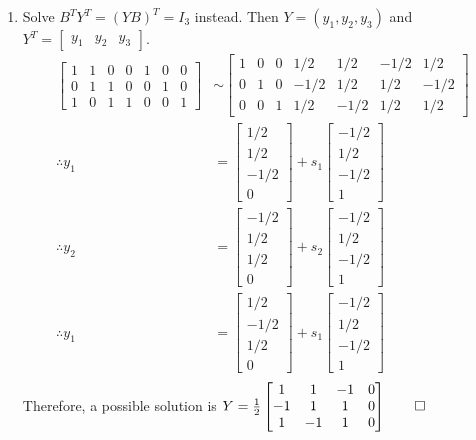 \documentclass[12pt, a4paper]{article}
\begin{document}
\begin{enumerate}[Q\arabic*.]
\begin{enumerate}[(\alph*)]
    \item Solve $B^TY^T = (YB)^T = I_3$ instead. Then $Y = (y_1, y_2, y_3)$ and $Y^T = \begin{bmatrix}y_1&y_2&y_3\end{bmatrix}$.
        \begin{align*}
          \begin{bmatrix}1&1&0&0&1&0&0\\0&1&1&0&0&1&0\\1&0&1&1&0&0&1\end{bmatrix} &\sim
          \begin{bmatrix}1&0&0&1/2&1/2&-1/2&1/2\\0&1&0&-1/2&1/2&1/2&-1/2\\0&0&1&1/2&-1/2&1/2&1/2\end{bmatrix}\\
          \therefore y_1 &= \begin{bmatrix}1/2\\1/2\\-1/2\\0\end{bmatrix} + s_1\begin{bmatrix}-1/2\\1/2\\-1/2\\1\end{bmatrix}\\
          \therefore y_2 &= \begin{bmatrix}-1/2\\1/2\\1/2\\0\end{bmatrix} + s_2\begin{bmatrix}-1/2\\1/2\\-1/2\\1\end{bmatrix}\\
          \therefore y_1 &= \begin{bmatrix}1/2\\-1/2\\1/2\\0\end{bmatrix} + s_1\begin{bmatrix}-1/2\\1/2\\-1/2\\1\end{bmatrix}\\
        \end{align*}
      Therefore, a possible solution is $Y = \frac{1}{2}\begin{bmatrix}1&1&-1&0\\-1&1&1&0\\1&-1&1&0\end{bmatrix} \qed$
    \end{enumerate}


\end{enumerate}
\end{document}
